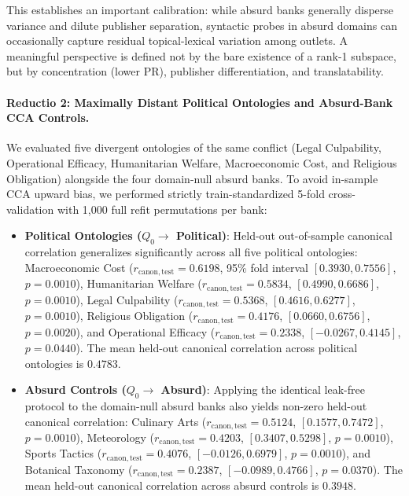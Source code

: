 This establishes an important calibration: while absurd banks generally disperse variance and dilute publisher separation, syntactic probes in absurd domains can occasionally capture residual topical-lexical variation among outlets. A meaningful perspective is defined not by the bare existence of a rank-1 subspace, but by concentration (lower PR), publisher differentiation, and translatability.

\paragraph{Reductio 2: Maximally Distant Political Ontologies and Absurd-Bank CCA Controls.}
We evaluated five divergent ontologies of the same conflict (Legal Culpability, Operational Efficacy, Humanitarian Welfare, Macroeconomic Cost, and Religious Obligation) alongside the four domain-null absurd banks. To avoid in-sample CCA upward bias, we performed strictly train-standardized 5-fold cross-validation with 1,000 full refit permutations per bank:
\begin{itemize}
    \item \textbf{Political Ontologies ($Q_0 \to$ Political)}: Held-out out-of-sample canonical correlation generalizes significantly across all five political ontologies: Macroeconomic Cost ($r_{\mathrm{canon,test}} = \mathbf{0.6198}$, 95\% fold interval $[0.3930, 0.7556]$, $p = 0.0010$), Humanitarian Welfare ($r_{\mathrm{canon,test}} = \mathbf{0.5834}$, $[0.4990, 0.6686]$, $p = 0.0010$), Legal Culpability ($r_{\mathrm{canon,test}} = \mathbf{0.5368}$, $[0.4616, 0.6277]$, $p = 0.0010$), Religious Obligation ($r_{\mathrm{canon,test}} = \mathbf{0.4176}$, $[0.0660, 0.6756]$, $p = 0.0020$), and Operational Efficacy ($r_{\mathrm{canon,test}} = \mathbf{0.2338}$, $[-0.0267, 0.4145]$, $p = 0.0440$). The mean held-out canonical correlation across political ontologies is $\mathbf{0.4783}$.
    \item \textbf{Absurd Controls ($Q_0 \to$ Absurd)}: Applying the identical leak-free protocol to the domain-null absurd banks also yields non-zero held-out canonical correlation: Culinary Arts ($r_{\mathrm{canon,test}} = \mathbf{0.5124}$, $[0.1577, 0.7472]$, $p = 0.0010$), Meteorology ($r_{\mathrm{canon,test}} = \mathbf{0.4203}$, $[0.3407, 0.5298]$, $p = 0.0010$), Sports Tactics ($r_{\mathrm{canon,test}} = \mathbf{0.4076}$, $[-0.0126, 0.6979]$, $p = 0.0010$), and Botanical Taxonomy ($r_{\mathrm{canon,test}} = \mathbf{0.2387}$, $[-0.0989, 0.4766]$, $p = 0.0370$). The mean held-out canonical correlation across absurd controls is $\mathbf{0.3948}$.
\end{itemize}

